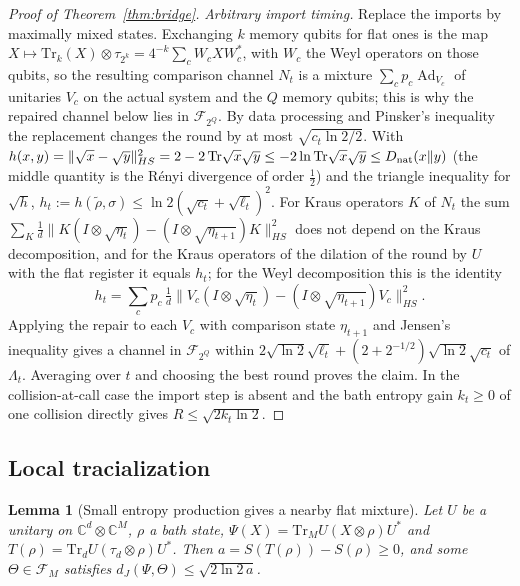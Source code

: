 \documentclass[11pt,a4paper]{article}
\theoremstyle{plain}
\newtheorem{lemma}[theorem]{Lemma}
\theoremstyle{definition}
\theoremstyle{remark}
\DeclareMathOperator{\Ad}{Ad}
\newcommand{\dJ}{d_J}
\begin{document}
\begin{proof}[Proof of Theorem~\ref{thm:bridge}]
\emph{Arbitrary import timing.} Replace the imports by maximally mixed states. Exchanging $k$ memory qubits for flat ones is the map
$X\mapsto\mathrm{Tr}_k(X)\otimes\tau_{2^k}=4^{-k}\sum_cW_cXW_c^*$, with $W_c$ the Weyl operators on those qubits, so the resulting comparison
channel $N_t$ is a mixture $\sum_cp_c\Ad_{V_c}$ of unitaries $V_c$ on the actual system and the $Q$ memory qubits; this is why the repaired
channel below lies in $\mathcal F_{2^Q}$. By data processing and Pinsker's inequality the replacement changes the round by at most
$\sqrt{c_t\ln2/2}$. With $h(x,y)=\|\sqrt x-\sqrt y\|_{HS}^2=2-2\,\mathrm{Tr}\sqrt x\sqrt y\le-2\ln\mathrm{Tr}\sqrt x\sqrt y\le D_{\rm nat}(x\|y)$
(the middle quantity is the R\'enyi divergence of order $\frac12$) and the triangle inequality for $\sqrt h$,
$h_t:=h(\tilde\rho,\sigma)\le\ln2(\sqrt{c_t}+\sqrt{\ell_t})^2$. For Kraus operators $K$ of $N_t$ the sum
$\sum_K\frac1d\|K(I\otimes\sqrt{\eta_t})-(I\otimes\sqrt{\eta_{t+1}})K\|_{HS}^2$ does not depend on the Kraus decomposition, and for the
Kraus operators of the dilation of the round by $U$ with the flat register it equals $h_t$; for the Weyl decomposition this is the
identity
\[
h_t=\sum_cp_c\,\tfrac1d\big\|V_c(I\otimes\sqrt{\eta_t})-(I\otimes\sqrt{\eta_{t+1}})V_c\big\|_{HS}^2 .
\]
Applying the repair to each $V_c$ with comparison state $\eta_{t+1}$ and Jensen's inequality gives a channel in
$\mathcal{F}_{2^Q}$ within $2\sqrt{\ln2}\sqrt{\ell_t}+(2+2^{-1/2})\sqrt{\ln2}\sqrt{c_t}$ of $\Lambda_t$. Averaging over
$t$ and choosing the best round proves the claim. In the collision-at-call case the import step is absent and the
bath entropy gain $k_t\ge0$ of one collision directly gives $R\le\sqrt{2k_t\ln2}$.
\end{proof}

\subsection{Local tracialization}

\begin{lemma}[Small entropy production gives a nearby flat mixture]\label{lem:tracialization}
Let $U$ be a unitary on $\mathbb C^d\otimes\mathbb C^M$, $\rho$ a bath state, $\Psi(X)=\mathrm{Tr}_M U(X\otimes\rho)U^*$ and
$T(\rho)=\mathrm{Tr}_dU(\tau_d\otimes\rho)U^*$. Then $a=S(T(\rho))-S(\rho)\ge0$, and some $\Theta\in\mathcal F_M$ satisfies
$\dJ(\Psi,\Theta)\le\sqrt{2\ln2\,a}$.
\end{lemma}
\end{document}
